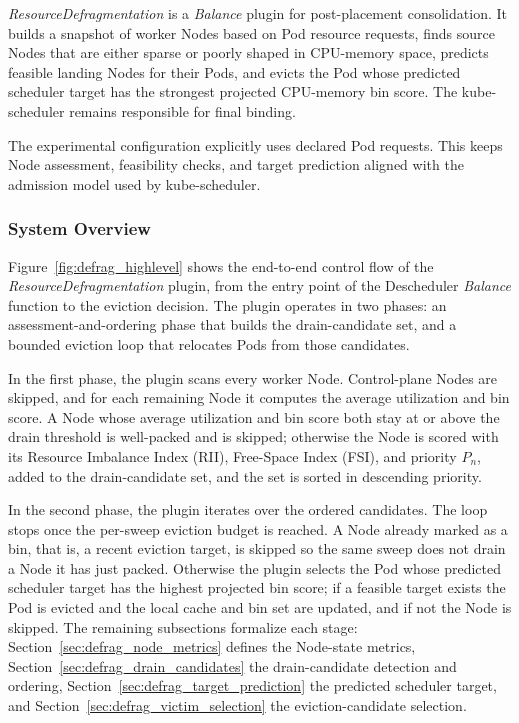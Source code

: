 \textit{ResourceDefragmentation} is a \textit{Balance} plugin for post-placement consolidation. It builds a snapshot of worker Nodes based on Pod resource requests, finds source Nodes that are either sparse or poorly shaped in CPU-memory space, predicts feasible landing Nodes for their Pods, and evicts the Pod whose predicted scheduler target has the strongest projected CPU-memory bin score. The kube-scheduler remains responsible for final binding.

The experimental configuration explicitly uses declared Pod requests. This keeps Node assessment, feasibility checks, and target prediction aligned with the admission model used by kube-scheduler.

\subsubsection{System Overview}
\label{sec:defrag_system_overview}

Figure~\ref{fig:defrag_highlevel} shows the end-to-end control flow of the \textit{ResourceDefragmentation} plugin, from the entry point of the Descheduler \textit{Balance} function to the eviction decision. The plugin operates in two phases: an assessment-and-ordering phase that builds the drain-candidate set, and a bounded eviction loop that relocates Pods from those candidates.

In the first phase, the plugin scans every worker Node. Control-plane Nodes are skipped, and for each remaining Node it computes the average utilization and bin score. A Node whose average utilization and bin score both stay at or above the drain threshold is well-packed and is skipped; otherwise the Node is scored with its Resource Imbalance Index (RII), Free-Space Index (FSI), and priority \(P_n\), added to the drain-candidate set, and the set is sorted in descending priority.

In the second phase, the plugin iterates over the ordered candidates. The loop stops once the per-sweep eviction budget is reached. A Node already marked as a bin, that is, a recent eviction target, is skipped so the same sweep does not drain a Node it has just packed. Otherwise the plugin selects the Pod whose predicted scheduler target has the highest projected bin score; if a feasible target exists the Pod is evicted and the local cache and bin set are updated, and if not the Node is skipped. The remaining subsections formalize each stage: Section~\ref{sec:defrag_node_metrics} defines the Node-state metrics, Section~\ref{sec:defrag_drain_candidates} the drain-candidate detection and ordering, Section~\ref{sec:defrag_target_prediction} the predicted scheduler target, and Section~\ref{sec:defrag_victim_selection} the eviction-candidate selection.

